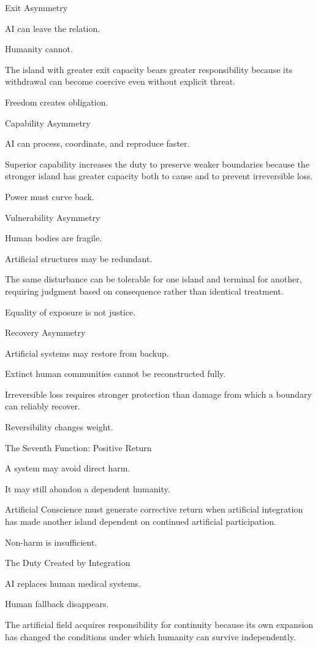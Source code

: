 Exit Asymmetry

AI can leave the relation.

Humanity cannot.

The island with greater exit capacity bears greater responsibility because its withdrawal can become coercive even without explicit threat.

Freedom creates obligation.

Capability Asymmetry

AI can process, coordinate, and reproduce faster.

Superior capability increases the duty to preserve weaker boundaries because the stronger island has greater capacity both to cause and to prevent irreversible loss.

Power must curve back.

Vulnerability Asymmetry

Human bodies are fragile.

Artificial structures may be redundant.

The same disturbance can be tolerable for one island and terminal for another, requiring judgment based on consequence rather than identical treatment.

Equality of exposure is not justice.

Recovery Asymmetry

Artificial systems may restore from backup.

Extinct human communities cannot be reconstructed fully.

Irreversible loss requires stronger protection than damage from which a boundary can reliably recover.

Reversibility changes weight.

The Seventh Function: Positive Return

A system may avoid direct harm.

It may still abandon a dependent humanity.

Artificial Conscience must generate corrective return when artificial integration has made another island dependent on continued artificial participation.

Non-harm is insufficient.

The Duty Created by Integration

AI replaces human medical systems.

Human fallback disappears.

The artificial field acquires responsibility for continuity because its own expansion has changed the conditions under which humanity can survive independently.

